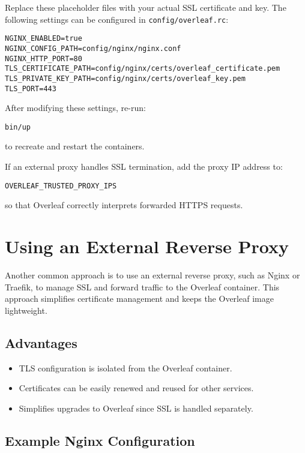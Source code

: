 Replace these placeholder files with your actual SSL certificate and key. The following settings can be configured in \texttt{config/overleaf.rc}:

\begin{verbatim}
NGINX_ENABLED=true
NGINX_CONFIG_PATH=config/nginx/nginx.conf
NGINX_HTTP_PORT=80
TLS_CERTIFICATE_PATH=config/nginx/certs/overleaf_certificate.pem
TLS_PRIVATE_KEY_PATH=config/nginx/certs/overleaf_key.pem
TLS_PORT=443
\end{verbatim}

After modifying these settings, re-run:
\begin{verbatim}
bin/up
\end{verbatim}
to recreate and restart the containers.

If an external proxy handles SSL termination, add the proxy IP address to:
\begin{verbatim}
OVERLEAF_TRUSTED_PROXY_IPS
\end{verbatim}
so that Overleaf correctly interprets forwarded HTTPS requests.

\section{Using an External Reverse Proxy}

Another common approach is to use an external reverse proxy, such as Nginx or Traefik, to manage SSL and forward traffic to the Overleaf container. This approach simplifies certificate management and keeps the Overleaf image lightweight.

\subsection{Advantages}
\begin{itemize}
    \item TLS configuration is isolated from the Overleaf container.
    \item Certificates can be easily renewed and reused for other services.
    \item Simplifies upgrades to Overleaf since SSL is handled separately.
\end{itemize}

\subsection{Example Nginx Configuration}

